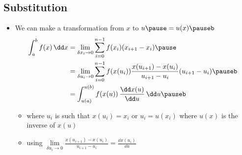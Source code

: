 \begin{slide}
\section[-2]{Substitution}
  
\begin{PauseHighLight}
  \begin{itemize}
  \item We can make a transformation from $x$ to $u\pause=u(x)\pauseb$
    \begin{align*}
      \int_a^b f(x) \, \dd x &= \lim_{\delta x_i \rightarrow 0}
      \sum_{i=0}^{n-1} f(x_i) (x_{i+1}-x_i) \pause\\
      &= \lim_{\delta u_i \rightarrow 0}
      \sum_{i=0}^{n-1} f(x(u_i)) \frac{x(u_{i+1})-x(u_i)}
      {u_{i+1}- u_i}   (u_{i+1}- u_i)\pauseb\\
      &= \int_{u(a)}^{u(b)} f(x(u)) \, \frac{\dd x(u)}{\dd u} \, \dd u\pauseb
    \end{align*}
    \begin{itemize}
    \item  where $u_i$ is such that $x(u_i) = x_i$ or $u_i=u(x_i)$
      where $u(x)$ is the inverse of $x(u)$\pause
    \item using $\lim\limits_{\delta u_i \rightarrow 0} \frac{x(u_{i+1})-x(u_i)}
      {u_{i+1}- u_i} = \frac{\dd x(u_i)}{\dd u}$\pauseb
    \end{itemize}
  \end{itemize}
\end{PauseHighLight}

\end{slide}



